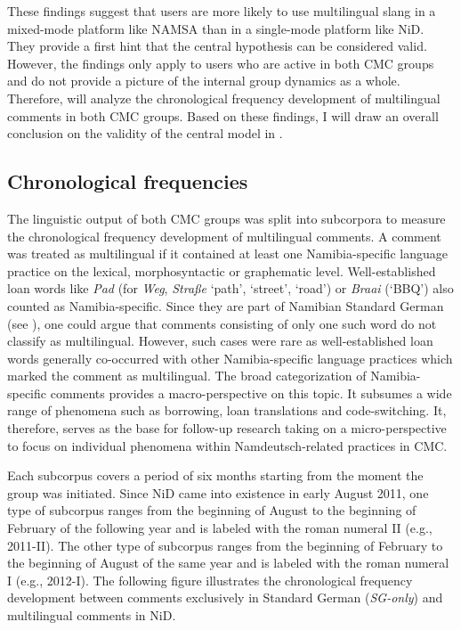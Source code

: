 \documentclass[output=paper]{langsci/langscibook}
\begin{document}
These findings suggest that users are more likely to use multilingual slang in a mixed-mode platform like NAMSA than in a single-mode platform like NiD. They provide a first hint that the central hypothesis can be considered valid. However, the findings only apply to users who are active in both CMC groups and do not provide a picture of the internal group dynamics as a whole. Therefore,  will analyze the chronological frequency development of multilingual comments in both CMC groups. Based on these findings, I will draw an overall conclusion on the validity of the central model in .

 
   
\subsection{Chronological frequencies}\largerpage
 \label{sec:radke:4.2}

The linguistic output of both CMC groups was split into subcorpora to measure the chronological frequency development of multilingual comments. A comment was treated as multilingual if it contained at least one Namibia-specific language practice on the lexical, morphosyntactic or graphematic level. Well-established loan words like \textit{Pad} (for \textit{Weg}, \textit{Straße} ‘path’, ‘street’, ‘road’) or \textit{Braai} (‘BBQ’) also counted as Namibia-specific. Since they are part of Namibian Standard German (see ), one could argue that comments consisting of only one such word do not classify as multilingual. However, such cases were rare as well-established loan words generally co-occurred with other Namibia-specific language practices which marked the comment as multilingual. The broad categorization of Namibia-specific comments provides a macro-perspective on this topic. It subsumes a wide range of phenomena such as borrowing, loan translations and code-switching. It, therefore, serves as the base for follow-up research taking on a micro-perspective to focus on individual phenomena within Namdeutsch-related practices in CMC. 

Each subcorpus covers a period of six months starting from the moment the group was initiated. Since NiD came into existence in early August 2011, one type of subcorpus ranges from the beginning of August to the beginning of February of the following year and is labeled with the roman numeral II (e.g., 2011-II). The other type of subcorpus ranges from the beginning of February to the beginning of August of the same year and is labeled with the roman numeral I (e.g., 2012-I). The following figure illustrates the chronological frequency development between comments exclusively in Standard German (\textit{SG-only}) and multilingual comments in NiD. 
\end{document}
